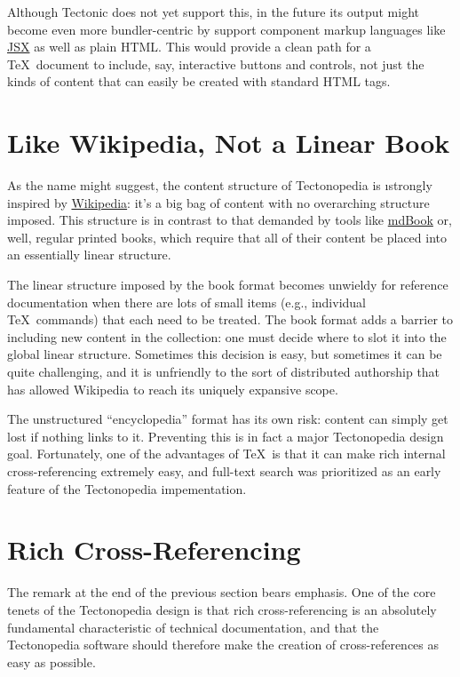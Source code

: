 Although Tectonic does not yet support this, in the future its output might
become even more bundler-centric by support component markup languages like
\href{https://react.dev/learn/writing-markup-with-jsx}{JSX} as well as plain
HTML. This would provide a clean path for a \TeX\ document to include, say,
interactive buttons and controls, not just the kinds of content that can easily
be created with standard HTML tags.

\section*{Like Wikipedia, Not a Linear Book}

As the name might suggest, the content structure of Tectonopedia is \i{strongly}
inspired by \href{https://www.wikipedia.org/}{Wikipedia}: it’s a big bag of
content with no overarching structure imposed. This structure is in contrast to
that demanded by tools like \href{https://rust-lang.github.io/mdBook/}{mdBook}
or, well, regular printed books, which require that all of their content be
placed into an essentially linear structure.

The linear structure imposed by the book format becomes unwieldy for reference
documentation when there are lots of small items (e.g., individual \TeX\
commands) that each need to be treated. The book format adds a barrier to
including new content in the collection: one must decide where to slot it into
the global linear structure. Sometimes this decision is easy, but sometimes it
can be quite challenging, and it is unfriendly to the sort of distributed
authorship that has allowed Wikipedia to reach its uniquely expansive scope.

The unstructured “encyclopedia” format has its own risk: content can simply get
lost if nothing links to it. Preventing this is in fact a major Tectonopedia
design goal. Fortunately, one of the advantages of \TeX\ is that it can make
rich internal cross-referencing extremely easy, and full-text search was
prioritized as an early feature of the Tectonopedia impementation.

\section*{Rich Cross-Referencing}

The remark at the end of the previous section bears emphasis. One of the core
tenets of the Tectonopedia design is that rich cross-referencing is an
absolutely fundamental characteristic of technical documentation, and that the
Tectonopedia software should therefore make the creation of cross-references as
easy as possible.

